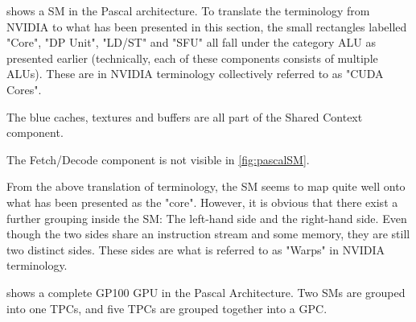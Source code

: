 
 shows a \gls{SM} in the Pascal architecture.
To translate the terminology from NVIDIA to what has been presented in this section, the small rectangles labelled "Core", "DP Unit", "LD/ST" and "SFU" all fall under the category \gls{ALU} as presented earlier (technically, each of these components consists of multiple \glspl{ALU}).
These are in NVIDIA terminology collectively referred to as "CUDA Cores".

The blue caches, textures and buffers are all part of the Shared Context component.

The Fetch/Decode component is not visible in \cref{fig:pascalSM}.

From the above translation of terminology, the \gls{SM} seems to map quite well onto what has been presented as the "core".
However, it is obvious that there exist a further grouping inside the \gls{SM}: The left-hand side and the right-hand side.
Even though the two sides share an instruction stream and some memory, they are still two distinct sides.
These sides are what is referred to as "Warps" in NVIDIA terminology.



 shows a complete GP100 GPU in the Pascal Architecture.
Two \glspl{SM} are grouped into one \glspl{TPC}, and five \glspl{TPC} are grouped together into a \gls{GPC}. \\


